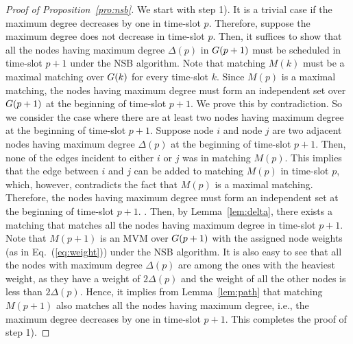 \documentclass[10pt,journal,compsoc]{IEEEtran}
\newcommand{\high}[1]{{\color{black}{#1}}}
\begin{document}
\begin{proof}[Proof of Proposition~\ref{pro:nsb}]
We start with step 1). It is a trivial case if the maximum degree decreases by one in time-slot $p$. 
Therefore, suppose the maximum degree does not decrease in time-slot $p$. Then, it suffices to 
show that all the nodes having maximum degree $\Delta(p)$ in $\Graph(p+1)$ must be scheduled in 
time-slot $p+1$ under the NSB algorithm. Note that matching $M(k)$ must be a maximal matching 
over $G(k)$ for every time-slot $k$. Since $M(p)$ is a maximal matching, the nodes having 
maximum degree must form an independent set over $\Graph(p+1)$ at the beginning of time-slot 
$p+1$. We prove this by contradiction. 
\high{Note that if there is only one node having maximum degree at the beginning of time-slot $p+1$, 
then it is trivial that the subgraph induced by this single node must consist of this node itself only and 
thus forms an independent set.} 
So we consider the case where there are at 
least two nodes having maximum degree at the beginning of time-slot $p+1$. Suppose node $i$ 
and node $j$ are two adjacent nodes having maximum degree $\Delta(p)$ at the beginning of time-slot 
$p+1$. Then, none of the edges incident to either $i$ or $j$ was in matching $M(p)$. This implies 
that the edge between $i$ and $j$ can be added to matching $M(p)$ in time-slot $p$, which, however, 
contradicts the fact that $M(p)$ is a maximal matching. Therefore, the nodes having maximum degree 
must form an independent set at the beginning of time-slot $p+1$. 
\high{Clearly, the subgraph induced by all the nodes having maximum degree forms an independent set 
and thus has no edges. In this case, it is trivial that this induced subgraph is bipartite}. 
Then, by Lemma~\ref{lem:delta}, there exists a matching \high{over $\Graph(p+1)$} that matches all the 
nodes having maximum degree 
in time-slot $p+1$. Note that $M(p+1)$ is an MVM over $\Graph(p+1)$ with the assigned node weights 
(as in Eq.~(\ref{eq:weight})) under the NSB algorithm. It is also easy to see that all the nodes with 
maximum degree $\Delta(p)$ are among the ones with the heaviest weight, as they have a weight of 
$2 \Delta(p)$ and the weight of all the other nodes is less than $2 \Delta(p)$. Hence, it implies from 
Lemma~\ref{lem:path} that matching $M(p+1)$ also matches all the nodes having maximum degree, 
i.e., the maximum degree decreases by one in time-slot $p+1$. This completes the proof of step 1).


\end{proof}
\end{document}
